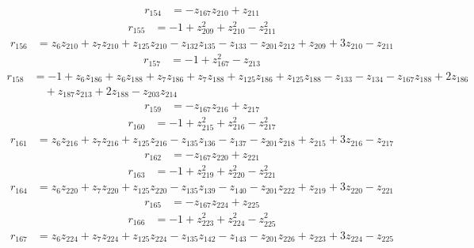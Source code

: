 \begin{align*}
r_{154} &= -z_{167}z_{210} + z_{211}
\end{align*}
\begin{align*}
r_{155} &= -1 + z_{209}^{2} + z_{210}^{2} - z_{211}^{2}
\end{align*}
\begin{align*}
r_{156} &= z_{6}z_{210} + z_{7}z_{210} + z_{125}z_{210} - z_{132}z_{135} - z_{133} - z_{201}z_{212} + z_{209} + 3z_{210} - z_{211}
\end{align*}
\begin{align*}
r_{157} &= -1 + z_{167}^{2} - z_{213}
\end{align*}
\begin{align*}
r_{158} &= -1 + z_{6}z_{186} + z_{6}z_{188} + z_{7}z_{186} + z_{7}z_{188} + z_{125}z_{186} + z_{125}z_{188} - z_{133} - z_{134} - z_{167}z_{188} + 2z_{186} \\
&\quad  + z_{187}z_{213} + 2z_{188} - z_{203}z_{214}
\end{align*}
\begin{align*}
r_{159} &= -z_{167}z_{216} + z_{217}
\end{align*}
\begin{align*}
r_{160} &= -1 + z_{215}^{2} + z_{216}^{2} - z_{217}^{2}
\end{align*}
\begin{align*}
r_{161} &= z_{6}z_{216} + z_{7}z_{216} + z_{125}z_{216} - z_{135}z_{136} - z_{137} - z_{201}z_{218} + z_{215} + 3z_{216} - z_{217}
\end{align*}
\begin{align*}
r_{162} &= -z_{167}z_{220} + z_{221}
\end{align*}
\begin{align*}
r_{163} &= -1 + z_{219}^{2} + z_{220}^{2} - z_{221}^{2}
\end{align*}
\begin{align*}
r_{164} &= z_{6}z_{220} + z_{7}z_{220} + z_{125}z_{220} - z_{135}z_{139} - z_{140} - z_{201}z_{222} + z_{219} + 3z_{220} - z_{221}
\end{align*}
\begin{align*}
r_{165} &= -z_{167}z_{224} + z_{225}
\end{align*}
\begin{align*}
r_{166} &= -1 + z_{223}^{2} + z_{224}^{2} - z_{225}^{2}
\end{align*}
\begin{align*}
r_{167} &= z_{6}z_{224} + z_{7}z_{224} + z_{125}z_{224} - z_{135}z_{142} - z_{143} - z_{201}z_{226} + z_{223} + 3z_{224} - z_{225}
\end{align*}
